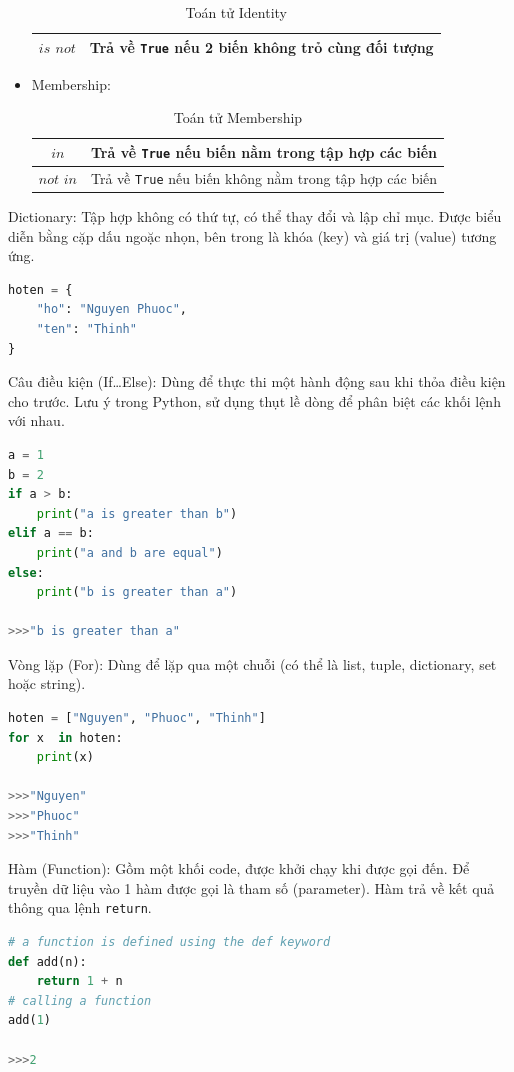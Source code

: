 \begin{itemize}
\begin{table}[!ht]
\begin{tabular}{|c|l|}
			\hline
			$is$ $not$ & Trả về \texttt{True} nếu 2 biến không trỏ cùng đối tượng\\
			\hline
		\end{tabular}
		\caption{Toán tử Identity}
	\end{table}
	\item Membership:
	\begin{table}[!ht]
		\centering
		\begin{tabular}{|c|l|}
			\hline
			$in$ & Trả về \texttt{True} nếu biến nằm trong tập hợp các biến\\
			\hline
			$not$ $in$ & Trả về \texttt{True} nếu biến không nằm trong tập hợp các biến\\
			\hline
		\end{tabular}
		\caption{Toán tử Membership}
	\end{table}
\end{itemize}
\par
Dictionary: Tập hợp không có thứ tự, có thể thay đổi và lập chỉ mục. Được biểu diễn bằng cặp dấu ngoặc nhọn, bên trong là khóa (key) và giá trị (value) tương ứng.
\begin{lstlisting}[language=Python]
hoten = {
	"ho": "Nguyen Phuoc",
	"ten": "Thinh"
}
\end{lstlisting}
\par
Câu điều kiện (If\ldots Else): Dùng để thực thi một hành động sau khi thỏa điều kiện cho trước. Lưu ý trong Python, sử dụng thụt lề dòng để phân biệt các khối lệnh với nhau.
\begin{lstlisting}[language=Python]
a = 1
b = 2
if a > b:
	print("a is greater than b")
elif a == b:
	print("a and b are equal")
else:
	print("b is greater than a")

>>>"b is greater than a"
\end{lstlisting}
\par
Vòng lặp (For): Dùng để lặp qua một chuỗi (có thể là list, tuple, dictionary, set hoặc string).
\begin{lstlisting}[language=Python]
hoten = ["Nguyen", "Phuoc", "Thinh"]
for x  in hoten:
	print(x)
	
>>>"Nguyen"
>>>"Phuoc"
>>>"Thinh"
\end{lstlisting}
\par
Hàm (Function): Gồm một khối code, được khởi chạy khi được gọi đến. Để truyền dữ liệu vào 1 hàm được gọi là tham số (parameter). Hàm trả về kết quả thông qua lệnh \texttt{return}.
\begin{lstlisting}[language=Python]
# a function is defined using the def keyword
def add(n):
	return 1 + n
# calling a function
add(1)

>>>2
\end{lstlisting}
